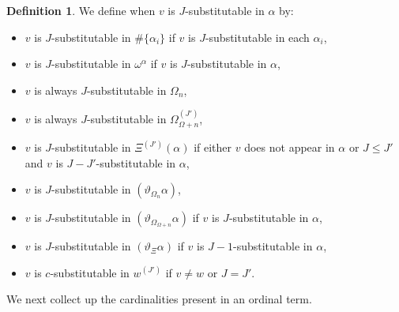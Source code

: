 \documentclass[11pt]{amsart}
\theoremstyle{definition}
\newtheorem{definition}[theorem]{Definition}
\begin{document}
\begin{definition}
  We define when $v$ is $J$-substitutable in $\alpha$ by:
  \begin{itemize}
  \item $v$ is $J$-substitutable in $\#\{\alpha_i\}$ if $v$ is $J$-substitutable in each $\alpha_i$,
  \item $v$ is $J$-substitutable in $\omega^\alpha$ if $v$ is $J$-substitutable in $\alpha$,
  \item $v$ is always $J$-substitutable in $\Omega_n$,
  \item $v$ is always $J$-substitutable in $\Omega^{(J')}_{\Omega+n}$,
  \item $v$ is $J$-substitutable in $\Xi^{(J')}(\alpha)$ if either $v$ does not appear in $\alpha$ or $J\leq J'$ and $v$ is $J-J'$-substitutable in $\alpha$,
  \item $v$ is $J$-substitutable in $(\vartheta_{\Omega_n}\alpha)$,
  \item $v$ is $J$-substitutable in $(\vartheta_{\Omega_{\Omega+n}}\alpha)$ if $v$ is $J$-substitutable in $\alpha$,
  \item $v$ is $J$-substitutable in $(\vartheta_\Xi\alpha)$ if $v$ is $J-1$-substitutable in $\alpha$,
  \item $v$ is $c$-substitutable in $w^{(J')}$ if $v\neq w$ or $J=J'$.
  \end{itemize}
\end{definition}

We next collect up the cardinalities present in an ordinal term. %
\end{document}
